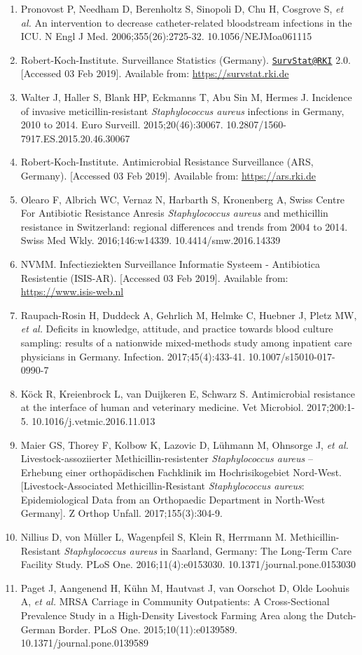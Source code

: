 \documentclass[
]{book}
\begin{document}
\begin{enumerate}
\item
  Pronovost P, Needham D, Berenholtz S, Sinopoli D, Chu H, Cosgrove S, \emph{et al.} An intervention to decrease catheter-related bloodstream infections in the ICU. N Engl J Med. 2006;355(26):2725-32. 10.1056/NEJMoa061115
\item
  Robert-Koch-Institute. Surveillance Statistics (Germany). \href{mailto:SurvStat@RKI}{\nolinkurl{SurvStat@RKI}} 2.0. {[}Accessed 03 Feb 2019{]}. Available from: \url{https://survstat.rki.de}
\item
  Walter J, Haller S, Blank HP, Eckmanns T, Abu Sin M, Hermes J. Incidence of invasive meticillin-resistant \emph{Staphylococcus aureus} infections in Germany, 2010 to 2014. Euro Surveill. 2015;20(46):30067. 10.2807/1560-7917.ES.2015.20.46.30067
\item
  Robert-Koch-Institute. Antimicrobial Resistance Surveillance (ARS, Germany). {[}Accessed 03 Feb 2019{]}. Available from: \url{https://ars.rki.de}
\item
  Olearo F, Albrich WC, Vernaz N, Harbarth S, Kronenberg A, Swiss Centre For Antibiotic Resistance Anresis \emph{Staphylococcus aureus} and methicillin resistance in Switzerland: regional differences and trends from 2004 to 2014. Swiss Med Wkly. 2016;146:w14339. 10.4414/smw.2016.14339
\item
  NVMM. Infectieziekten Surveillance Informatie Systeem - Antibiotica Resistentie (ISIS-AR). {[}Accessed 03 Feb 2019{]}. Available from: \url{https://www.isis-web.nl}
\item
  Raupach-Rosin H, Duddeck A, Gehrlich M, Helmke C, Huebner J, Pletz MW, \emph{et al.} Deficits in knowledge, attitude, and practice towards blood culture sampling: results of a nationwide mixed-methods study among inpatient care physicians in Germany. Infection. 2017;45(4):433-41. 10.1007/s15010-017-0990-7
\item
  Köck R, Kreienbrock L, van Duijkeren E, Schwarz S. Antimicrobial resistance at the interface of human and veterinary medicine. Vet Microbiol. 2017;200:1-5. 10.1016/j.vetmic.2016.11.013
\item
  Maier GS, Thorey F, Kolbow K, Lazovic D, Lühmann M, Ohnsorge J, \emph{et al.} Livestock-assoziierter Methicillin-resistenter \emph{Staphylococcus aureus} -- Erhebung einer orthopädischen Fachklinik im Hochrisikogebiet Nord-West. {[}Livestock-Associated Methicillin-Resistant \emph{Staphylococcus aureus}: Epidemiological Data from an Orthopaedic Department in North-West Germany{]}. Z Orthop Unfall. 2017;155(3):304-9.
\item
  Nillius D, von Müller L, Wagenpfeil S, Klein R, Herrmann M. Methicillin-Resistant \emph{Staphylococcus aureus} in Saarland, Germany: The Long-Term Care Facility Study. PLoS One. 2016;11(4):e0153030. 10.1371/journal.pone.0153030
\item
  Paget J, Aangenend H, Kühn M, Hautvast J, van Oorschot D, Olde Loohuis A, \emph{et al.} MRSA Carriage in Community Outpatients: A Cross-Sectional Prevalence Study in a High-Density Livestock Farming Area along the Dutch-German Border. PLoS One. 2015;10(11):e0139589. 10.1371/journal.pone.0139589
\end{enumerate}
\end{document}
